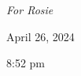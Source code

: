 \thispagestyle{empty}
\clearpage
\begin{center}
    \thispagestyle{empty}
    \vspace*{\fill}
    \em{For Rosie}

    April 26, 2024

    8:52 pm
    \vspace*{\fill}
\end{center}
\clearpage

